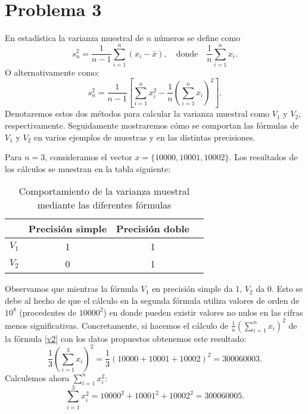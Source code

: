 \documentclass[a4paper]{article}
\begin{document}
\section*{Problema 3}
En estadística la varianza muestral de $n$ números se define como \begin{equation}
    s_{n}^2=\frac{1}{n-1}\sum_{i=1}^{n}(x_i-\bar{x}),\quad\text{donde}\quad\frac{1}{n}\sum_{i=1}^{n}x_{i}.
\end{equation}
O alternativamente como:  
\begin{equation}
    s_{n}^{2}=\frac{1}{n-1}\left[\sum_{i=1}^{n}x_{i}^2-\frac{1}{n}\left(\sum_{i=1}^{n}x_{i}\right)^2\right].
    \label{v2}
\end{equation} Denotaremos estos dos métodos para calcular la varianza muestral como $V_{1}$ y $V_{2}$, respectivamente. Seguidamente mostraremos cómo se comportan las fórmulas de $V_1$ y $V_2$ en varios ejemplos de muestras y en las distintas precisiones.\par Para $n=3$, consideramos el vector $x=\{10000,10001,10002\}$. Los resultados de los cálculos se muestran en la tabla siguiente:\par
\begin{table}[ht]
	\centering
	\begin{tabular}{|c|c|c|c|}
	    \hline
		& Precisión simple & Precisión doble \\
		\hline 
		$V_{1}$ & 1 & 1\\
		\hline
		$V_{2}$ & 0 & 1\\
		\hline
	\end{tabular}
		\caption{Comportamiento de la varianza muestral mediante las diferentes fórmulas}
		\label{tab:11}
\end{table}
Observamos que mientras la fórmula $V_{1}$ en precisión simple da 1, $V_{2}$ da 0. Esto se debe al hecho de que el cálculo en la segunda fórmula utiliza valores de orden de $10^{8}$ (procedentes de $10000^2$) en donde pueden existir valores no nulos en las cifras menos significativas. Concretamente, si hacemos el cálculo de $\frac{1}{n}\left(\sum_{i=1}^{n}x_{i}\right)^2$ de la fórmula \eqref{v2} con los datos propuestos obtenemos este resultado:
\begin{equation}
    \frac{1}{3}\left(\sum_{i=1}^3x_{i}\right)^2=\frac{1}{3}(10000+10001+10002)^2=300060003.
    \label{v11}
\end{equation}
Calculemos ahora $\sum_{i=1}^{n}x_{i}^2$: 
\begin{equation}
\sum_{i=1}^{3}x_{i}^2=10000^2+10001^2+10002^2=300060005.
\label{v12}
\end{equation}
\end{document}
